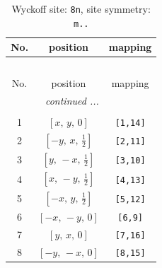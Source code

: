 \documentclass[fleqn,8pt]{jsarticle}
\begin{document}
\begin{longtable}{ccc}
\caption{Wyckoff site: {\tt 8n}, site symmetry: {\tt m..}}
 \\
 \hline \hline
No. & position & mapping \\ \hline \endfirsthead

\multicolumn{2}{l}{\tablename\ \thetable{}} \\
 \hline \hline
No. & position & mapping \\ \hline \endhead

 \hline \hline
\multicolumn{2}{r}{\footnotesize\it continued ...} \\ \endfoot

 \hline \hline
\multicolumn{2}{r}{} \\ \endlastfoot

1 & $\left[ x,\, y,\, 0 \right]$ & {\tt [1,14]} \\ \hline
2 & $\left[ - y,\, x,\, \frac{1}{2} \right]$ & {\tt [2,11]} \\ \hline
3 & $\left[ y,\, - x,\, \frac{1}{2} \right]$ & {\tt [3,10]} \\ \hline
4 & $\left[ x,\, - y,\, \frac{1}{2} \right]$ & {\tt [4,13]} \\ \hline
5 & $\left[ - x,\, y,\, \frac{1}{2} \right]$ & {\tt [5,12]} \\ \hline
6 & $\left[ - x,\, - y,\, 0 \right]$ & {\tt [6,9]} \\ \hline
7 & $\left[ y,\, x,\, 0 \right]$ & {\tt [7,16]} \\ \hline
8 & $\left[ - y,\, - x,\, 0 \right]$ & {\tt [8,15]} \\
\end{longtable}
\renewcommand{\arraystretch}{1.2}
\end{document}
